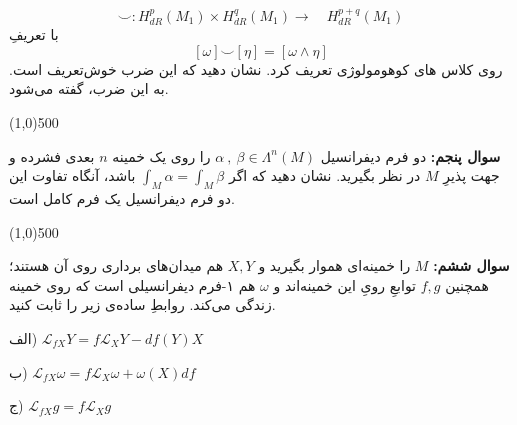 \documentclass{article}
\def\a{\alpha}
\newenvironment{parind}{%
	\par%
	\medskip
	\leftskip=10mm\rightskip=7mm
	\noindent\ignorespaces}{%
	\par\medskip}
\begin{document}
\[\smile : H^p_{{dR}}(M_1) \times H^q_{{dR}}(M_1) \rightarrow{\quad} H^{p+q}_{{dR}}(M_1)\]
با تعریفِ
\[
[\omega] \smile [\eta] = [\omega \wedge \eta]
\]
روی کلاس های کوهومولوژی تعریف کرد. نشان دهید که این ضرب 
خوش‌تعریف است. به این ضرب، 
گفته می‌شود.

\vspace{-3em}


{\color{cyan}
	\begin{center} \linethickness{1mm}\line(1,0){500} \end{center}
}


\textbf{سوال پنجم:}
دو فرم دیفرانسیل
$\a\ ,\ \beta \in \Lambda^n(M)$
را روی یک خمینه 
$n$
بعدی فشرده و جهت پذیرِ
$M$ 
در نظر بگیرید. نشان دهید که اگر
$\int _M \a=\int_M\beta$
باشد،
آنگاه تفاوت این دو فرم دیفرانسیل یک فرم کامل
است. 



\vspace{-3em}

{\color{cyan}
	\begin{center} \linethickness{1mm}\line(1,0){500} \end{center}
}



\textbf{سوال ششم: }$M$ را خمینه‌ای هموار بگیرید و 
$X,Y$ هم میدان‌های برداری روی آن هستند؛ همچنین $f,g$ توابعِ رویِ این خمینه‌اند و $\omega$
هم ۱-فرم دیفرانسیلی است که روی خمینه زندگی می‌کند. روابطِ ساده‌ی زیر را ثابت کنید.
\begin{parind}
	الف)
	$\mathcal{L}_{fX} Y = f \mathcal{L}_X Y - df(Y)X$
	
	ب)
	$\mathcal{L}_{fX} \omega  = f\mathcal{L}_X \omega + \omega(X) df$
	
	ج)
	$\mathcal{L}_{fX} g = f\mathcal{L}_Xg$
\end{parind}
\end{document}
